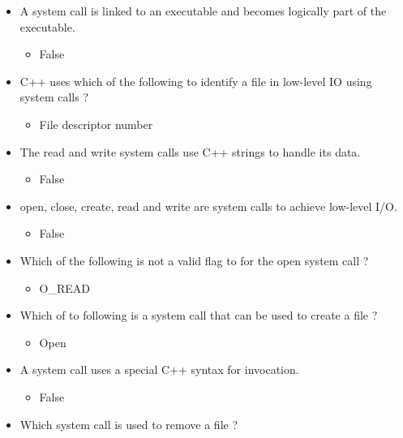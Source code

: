 \documentclass{report}
\begin{document}
    \pagebreak 
    \begin{itemize}
        \item A system call is linked to an executable and becomes logically part of the executable.
            \begin{itemize}
                \item False
            \end{itemize}
        \item C++ uses which of the following to identify a  file in low-level IO using system calls ?
            \begin{itemize}
                \item File descriptor number
            \end{itemize}
        \item The read and write system calls use C++ strings to handle its data.
            \begin{itemize}
                \item False
            \end{itemize}
        \item open, close, create, read and write are system calls to achieve low-level I/O.
            \begin{itemize}
                \item False
            \end{itemize}
        \item Which of the following is not a valid flag to for the open system call ?
            \begin{itemize}
                \item O\_READ
            \end{itemize}
        \item Which of to following is a system call that can be used to create a file ?
            \begin{itemize}
                \item Open
            \end{itemize}
        \item A system call uses a special C++ syntax for invocation.
            \begin{itemize}
                \item False
            \end{itemize}
        \item Which system call is used to remove a file ?
            \begin{itemize}

\end{itemize}
\end{itemize}
\end{document}
